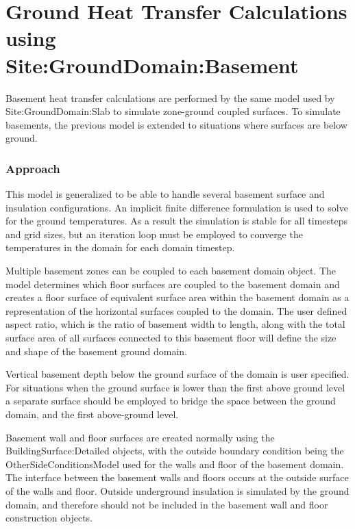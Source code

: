 \section{Ground Heat Transfer Calculations using \\
		Site:GroundDomain:Basement}\label{ground-heat-transfer-calculations-using-sitegrounddomainbasement}

Basement heat transfer calculations are performed by the same model used by Site:GroundDomain:Slab to simulate zone-ground coupled surfaces. To simulate basements, the previous model is extended to situations where surfaces are below ground.

\subsubsection{Approach}\label{approach-000}

This model is generalized to be able to handle several basement surface and insulation configurations. An implicit finite difference formulation is used to solve for the ground temperatures. As a result the simulation is stable for all timesteps and grid sizes, but an iteration loop must be employed to converge the temperatures in the domain for each domain timestep.

Multiple basement zones can be coupled to each basement domain object. The model determines which floor surfaces are coupled to the basement domain and creates a floor surface of equivalent surface area within the basement domain as a representation of the horizontal surfaces coupled to the domain. The user defined aspect ratio, which is the ratio of basement width to length, along with the total surface area of all surfaces connected to this basement floor will define the size and shape of the basement ground domain.

Vertical basement depth below the ground surface of the domain is user specified. For situations when the ground surface is lower than the first above ground level a separate surface should be employed to bridge the space between the ground domain, and the first above-ground level.

Basement wall and floor surfaces are created normally using the BuildingSurface:Detailed objects, with the outside boundary condition being the OtherSideConditionsModel used for the walls and floor of the basement domain. The interface between the basement walls and floors occurs at the outside surface of the walls and floor. Outside underground insulation is simulated by the ground domain, and therefore should not be included in the basement wall and floor construction objects.

